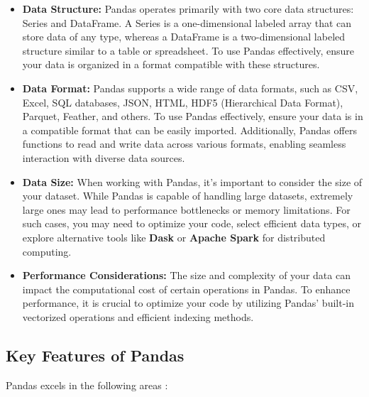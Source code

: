 \begin{itemize}
	
	\item \textbf{Data Structure:} Pandas operates primarily with two core data structures: Series and DataFrame. A Series is a one-dimensional labeled array that can store data of any type, whereas a DataFrame is a two-dimensional labeled structure similar to a table or spreadsheet. To use Pandas effectively, ensure your data is organized in a format compatible with these structures.
	
	\item \textbf{Data Format:} Pandas supports a wide range of data formats, such as CSV, Excel, SQL databases, JSON, HTML, HDF5 (Hierarchical Data Format), Parquet, Feather, and others. To use Pandas effectively, ensure your data is in a compatible format that can be easily imported. Additionally, Pandas offers functions to read and write data across various formats, enabling seamless interaction with diverse data sources.
	
	\item \textbf{Data Size:} When working with Pandas, it’s important to consider the size of your dataset. While Pandas is capable of handling large datasets, extremely large ones may lead to performance bottlenecks or memory limitations. For such cases, you may need to optimize your code, select efficient data types, or explore alternative tools like \textbf{Dask} or \textbf{Apache Spark} for distributed computing.
	
	\item \textbf{Performance Considerations:} The size and complexity of your data can impact the computational cost of certain operations in Pandas. To enhance performance, it is crucial to optimize your code by utilizing Pandas' built-in vectorized operations and efficient indexing methods.
	
	
\end{itemize}

\subsection{Key Features of Pandas}

Pandas excels in the following areas \cite{Betancourt:2019}:

